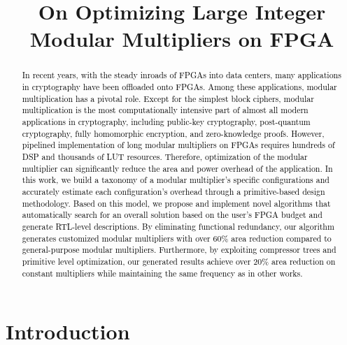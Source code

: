 \documentclass[conference]{IEEEtran}
\title{On Optimizing Large Integer Modular Multipliers on FPGA}
\begin{document}
\maketitle
\thispagestyle{plain}
\pagestyle{plain}


\begin{abstract}
\textcolor{black}{
In recent years, with the steady inroads of FPGAs into data centers, many applications in cryptography have been offloaded onto FPGAs. Among these applications, modular multiplication has a pivotal role. Except for the simplest block ciphers, modular multiplication is the most computationally intensive part of almost all modern applications in cryptography, including public-key cryptography, post-quantum cryptography, fully homomorphic encryption, and zero-knowledge proofs. However, pipelined implementation of long modular multipliers on FPGAs requires hundreds of DSP and thousands of LUT resources. Therefore, optimization of the modular multiplier can significantly reduce the area and power overhead of the application. In this work, we build a taxonomy of a modular multiplier's specific configurations and accurately estimate each configuration's overhead through a primitive-based design methodology. Based on this model, we propose and implement novel algorithms that automatically search for an overall solution based on the user's FPGA budget and generate RTL-level descriptions. By eliminating functional redundancy, our algorithm generates customized modular multipliers with over 60\% area reduction compared to general-purpose modular multipliers. Furthermore, by exploiting compressor trees and primitive level optimization, our generated results achieve over 20\% area reduction on constant multipliers while maintaining the same frequency as in other works.
}
\end{abstract}

\section{Introduction}
 
\graphicspath{ {./images/} }

\end{document}
